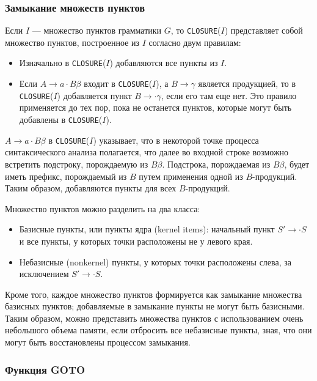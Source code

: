 \documentclass[bachelor, och, coursework, times]{SCWorks}
\begin{document}
\subsubsection{Замыкание множеств пунктов}

Если $I$ --- множество пунктов грамматики $G$, то \verb|CLOSURE|($I$) представляет собой множество пунктов, построенное из $I$ согласно двум правилам:
\begin{itemize}
	\item Изначально в \verb|CLOSURE|($I$) добавляются все пункты из $I$. 
	\item Если $A \to a \cdot B\beta$ входит в \verb|CLOSURE|($I$), а $B \to \gamma$ является продукцией, то в \verb|CLOSURE|($I$) добавляется пункт $B \to \cdot \gamma$, если его там еще нет. Это правило применяется до тех пор, пока не останется пунктов, которые могут быть добавлены в \verb|CLOSURE|($I$).
\end{itemize}

$A \to a \cdot B\beta$ в \verb|CLOSURE|($I$) указывает, что в некоторой точке процесса синтаксического анализа полагается, что далее во входной строке возможно встретить подстроку, порождаемую из $B\beta$. Подстрока, порождаемая из $B\beta$, будет иметь префикс, порождаемый из $B$ путем применения одной из $B$-продукций. Таким образом,  добавляются пункты для всех $B$-продукций. 

Множество пунктов можно разделить на два класса: 
\begin{itemize}
	\item Базисные пункты, или пункты ядра (kernel items): начальный пункт \linebreak 
	$S' \to \cdot S$ и все пункты, у которых точки расположены не у левого края. 
	\item Небазисные (nonkernel) пункты, у которых точки расположены слева, за исключением $S' \to \cdot S$. 
\end{itemize}
Кроме того, каждое множество пунктов формируется как замыкание множества базисных пунктов; добавляемые в замыкание пункты не могут быть базисными. Таким образом, можно представить множества пунктов с использованием очень небольшого объема памяти, если отбросить все небазисные пункты, зная, что они могут быть восстановлены процессом замыкания.~\cite{Sokolov}

\subsubsection{Функция GOTO}
\end{document}
